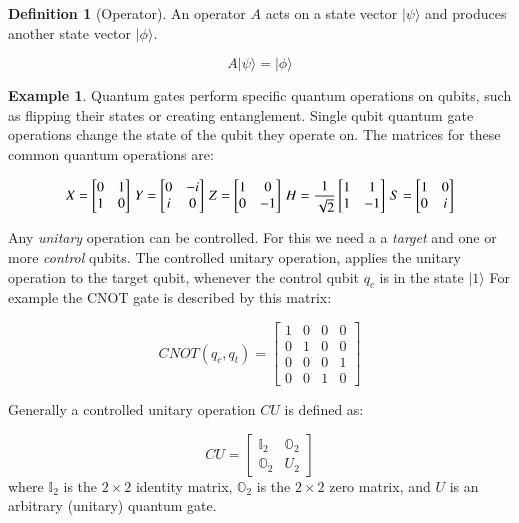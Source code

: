 \documentclass[11pt]{article}
\providecommand{\ket}[1]{|#1\rangle}
\newcommand{\myvec}[1]{\ensuremath{\begin{bmatrix}#1\end{bmatrix}}}
\theoremstyle{definition}
\newtheorem{exmp}{Example}[section]
\theoremstyle{definition}
\newtheorem{definition}{Definition}[section]
\begin{document}
\begin{definition}[Operator]
An operator $A$ acts on a state vector $\ket{\psi}$ and produces another state vector $\ket{\phi}$.

\begin{equation}
A\ket{\psi} = \ket{\phi}
\end{equation}

\end{definition}





\begin{exmp}
  Quantum gates perform specific quantum operations on qubits, such as flipping their states or creating
  entanglement.
  Single qubit quantum gate operations change the state of the qubit they operate on.
  The matrices for these common quantum operations are:

  \begin{equation}
  X = \myvec{0 & 1 \\ 1 & 0} \thinspace
  Y = \myvec{0 & -i\\ i & 0} \thinspace
  Z = \myvec{1 & 0 \\ 0 & -1} \thinspace
  H = \frac{1}{\sqrt{2}} \myvec{1 & 1 \\ 1 & -1 } \thinspace
  S = \myvec{1 & 0 \\ 0 & i}
  \end{equation}

  Any \textit{unitary} operation can be controlled.
  For this we need a a \textit{target} and one or more \textit{control} qubits.
  The controlled unitary operation, applies the unitary operation to the target
  qubit, whenever the control qubit $q_c$ is in the state $\ket{1}$
  For example the CNOT gate is described by this matrix:

  \begin{equation}
  CNOT(q_c, q_t) = \begin{bmatrix}  1 & 0 & 0 & 0 \\
                            0 & 1 & 0 & 0 \\
                            0 & 0 & 0 & 1 \\
                            0 & 0 & 1 & 0 \end{bmatrix}
   \end{equation}
   \end{exmp}

Generally a controlled unitary operation \(CU\) is defined as:

\begin{equation}
CU = \begin{bmatrix}
        \mathbb{I}_2 & \mathbb{O}_2 \\
        \mathbb{O}_2 & U_2 \end{bmatrix}
\end{equation}
  where \(\mathbb{I}_2\) is the \(2\times2\) identity matrix, \(\mathbb{O}_2\) is
the \(2\times2\) zero matrix, and \(U\) is an arbitrary (unitary) quantum gate.
\end{document}
